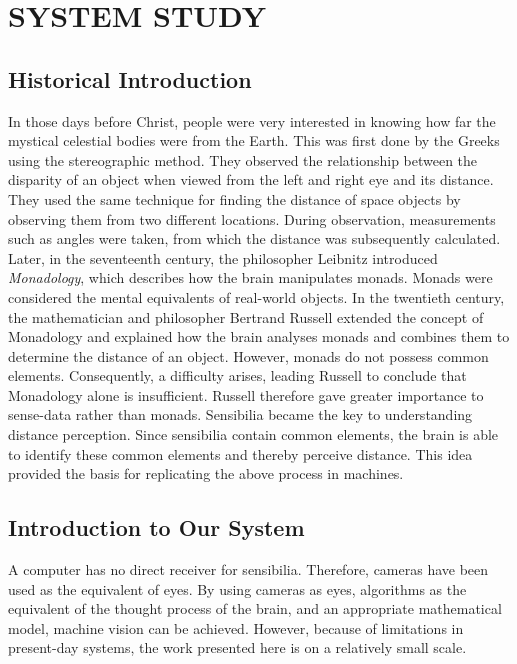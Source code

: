 \documentclass[12pt]{report}
\begin{document}
 \chapter{SYSTEM STUDY} 
\section{Historical Introduction} 
In those days before Christ, people were very interested in knowing how far the mystical celestial bodies were from the Earth. This was first done by the Greeks using the stereographic method. They observed the relationship between the disparity of an object when viewed from the left and right eye and its distance. They used the same technique for finding the distance of space objects by observing them from two different locations. During observation, measurements such as angles were taken, from which the distance was subsequently calculated. Later, in the seventeenth century, the philosopher Leibnitz introduced \textit{Monadology}, which describes how the brain manipulates monads. Monads were considered the mental equivalents of real-world objects. In the twentieth century, the mathematician and philosopher Bertrand Russell extended the concept of Monadology and explained how the brain analyses monads and combines them to determine the distance of an object. However, monads do not possess common elements. Consequently, a difficulty arises, leading Russell to conclude that Monadology alone is insufficient. Russell therefore gave greater importance to sense-data rather than monads. Sensibilia became the key to understanding distance perception. Since sensibilia contain common elements, the brain is able to identify these common elements and thereby perceive distance. This idea provided the basis for replicating the above process in machines. 
\section{Introduction to Our System} A computer has no direct receiver for sensibilia. Therefore, cameras have been used as the equivalent of eyes. By using cameras as eyes, algorithms as the equivalent of the thought process of the brain, and an appropriate mathematical model, machine vision can be achieved. However, because of limitations in present-day systems, the work presented here is on a relatively small scale.
\end{document}
